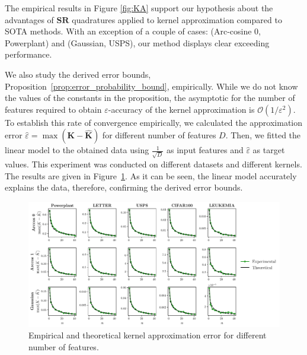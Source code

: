 The empirical results in Figure \ref{fig:KA} support our hypothesis about the advantages of $\mathbf{SR}$ quadratures applied to kernel approximation compared to SOTA methods.
With an exception of a couple of cases: (Arc-cosine 0, Powerplant) and (Gaussian, USPS), our method displays clear exceeding performance.

We also study the derived error bounds, Proposition~\ref{prop:error_probability_bound}, empirically.
While we do not know the values of the constants in the proposition,
the asymptotic for the number of features required to obtain $\varepsilon$-accuracy
of the kernel approximation is $\mathcal{O}(1 / \varepsilon^2)$.
To establish this rate of convergence empirically,
we calculated the approximation error $\hat{\varepsilon} = \max (\mathbf{K} - \widehat{\mathbf{K}})$
for different number of features $D$.
Then, we fitted the linear model to the obtained data using $\frac{1}{\sqrt{D}}$ as
input features and $\hat{\varepsilon}$ as target values.
This experiment was conducted on different datasets and different kernels.
The results are given in Figure~\ref{fig:err_bound}.
As it can be seen, the linear model accurately explains the data,
therefore, confirming the derived error bounds.

\begin{figure}
    \centering
    \includegraphics[width=\textwidth]{figures/quadratures/err_bound.pdf}
    \caption{Empirical and theoretical kernel approximation error for different
    number of features.}
    \label{fig:err_bound}
\end{figure}



